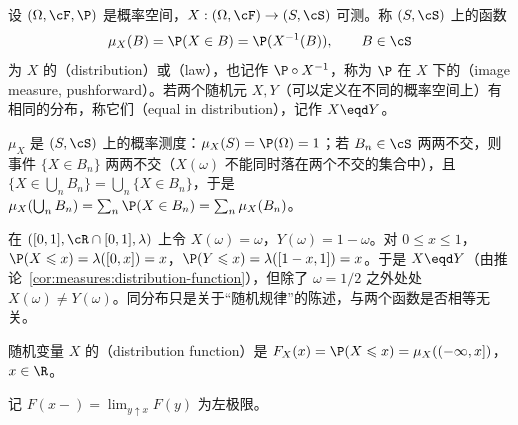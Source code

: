 
\begin{definition}[分布]\label{def:distributions:law}
设 $(\Omega,\cF,\P)$ 是概率空间，$X:(\Omega,\cF)\to(S,\cS)$ 可测。称 $(S,\cS)$ 上的函数
\[
\mu_X(B)=\P(X\in B)=\P(X^{-1}(B)),\qquad B\in\cS
\]
为 $X$ 的（distribution）或（law），也记作 $\P\circ X^{-1}$，称为 $\P$ 在 $X$ 下的（image measure, pushforward）。若两个随机元 $X,Y$（可以定义在不同的概率空间上）有相同的分布，称它们（equal in distribution），记作 $X\eqd Y$。
\end{definition}

$\mu_X$ 是 $(S,\cS)$ 上的概率测度：$\mu_X(S)=\P(\Omega)=1$；若 $B_n\in\cS$ 两两不交，则事件 $\{X\in B_n\}$ 两两不交（$X(\omega)$ 不能同时落在两个不交的集合中），且 $\{X\in\bigcup_nB_n\}=\bigcup_n\{X\in B_n\}$，于是 $\mu_X(\bigcup_nB_n)=\sum_n\P(X\in B_n)=\sum_n\mu_X(B_n)$。

\begin{example}[分布不决定随机变量]
在 $([0,1],\cR\cap[0,1],\lambda)$ 上令 $X(\omega)=\omega$，$Y(\omega)=1-\omega$。对 $0\leqslant x\leqslant1$，$\P(X\leqslant x)=\lambda([0,x])=x$，$\P(Y\leqslant x)=\lambda([1-x,1])=x$。于是 $X\eqd Y$（由推论~\ref{cor:measures:distribution-function}），但除了 $\omega=1/2$ 之外处处 $X(\omega)\neq Y(\omega)$。同分布只是关于“随机规律”的陈述，与两个函数是否相等无关。
\end{example}

\begin{definition}[分布函数]\label{def:distributions:df}
随机变量 $X$ 的（distribution function）是 $F_X(x)=\P(X\leqslant x)=\mu_X((-\infty,x])$，$x\in\R$。
\end{definition}

记 $F(x-)=\lim_{y\uparrow x}F(y)$ 为左极限。

